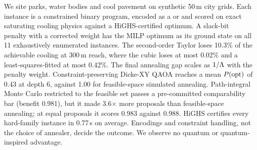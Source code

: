 We site parks, water bodies and cool pavement on synthetic 50\,m city grids. Each instance is a
constrained binary program, encoded as a \QUBO{} or \HUBO{} and scored on exact saturating cooling
physics against a HiGHS-certified optimum. A slack-bit penalty \QUBO{} with a corrected weight has
the MILP optimum as its ground state on all 11 exhaustively enumerated instances. The second-order
Taylor \QUBO{} loses 10.3\% of the achievable cooling at 300\,m reach, where the cubic \HUBO{} loses
at most 0.02\% and a least-squares-fitted \QUBO{} at most 0.42\%. The final annealing gap scales as
$1/\Lambda$ with the penalty weight. Constraint-preserving Dicke-XY QAOA reaches a mean $P(\mathrm{opt})$ of
0.43 at depth 6, against 1.00 for feasible-space simulated annealing. Path-integral Monte Carlo
restricted to the feasible set passes a pre-committed comparability bar (benefit 0.981), but it
made 3.6$\times$ more proposals than feasible-space annealing; at equal proposals it scores 0.983
against 0.988. HiGHS certifies every hard-family instance in 0.77\,s on average. Encodings and
constraint handling, not the choice of annealer, decide the outcome. We observe no quantum or
quantum-inspired advantage.
